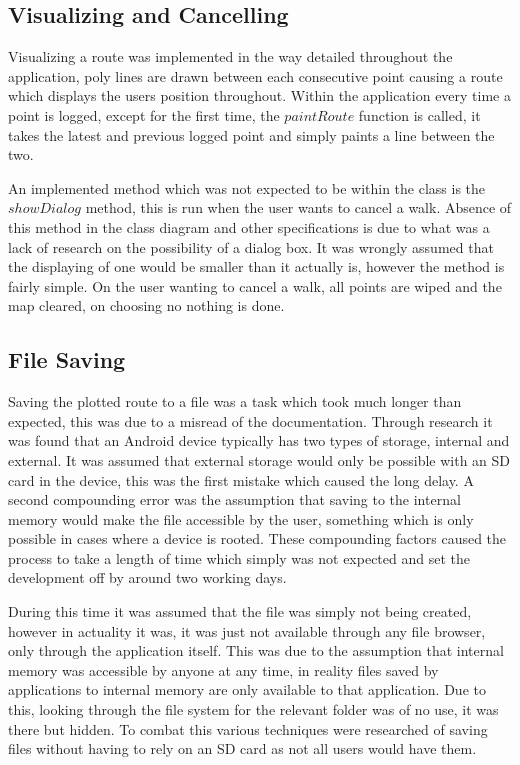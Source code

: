 \subsection{Visualizing and Cancelling}
Visualizing a route was implemented in the way detailed throughout the application, poly lines are drawn between each consecutive point causing a route which displays the users position throughout. Within the application every time a point is logged, except for the first time, the $paintRoute$ function is called, it takes the latest and previous logged point and simply paints a line between the two.

An implemented method which was not expected to be within the class is the $showDialog$ method, this is run when the user wants to cancel a walk. Absence of this method in the class diagram and other specifications is due to what was a lack of research on the possibility of a dialog box. It was wrongly assumed that the displaying of one would be smaller than it actually is, however the method is fairly simple. On the user wanting to cancel a walk, all points are wiped and the map cleared, on choosing no nothing is done.

\subsection{File Saving}
Saving the plotted route to a file was a task which took much longer than expected, this was due to a misread of the documentation. Through research it was found that an Android device typically has two types of storage, internal and external. It was assumed that external storage would only be possible with an SD card in the device, this was the first mistake which caused the long delay. A second compounding error was the assumption that saving to the internal memory would make the file accessible by the user\cite{storage}, something which is only possible in cases where a device is rooted. These compounding factors caused the process to take a length of time which simply was not expected and set the development off by around two working days. 

During this time it was assumed that the file was simply not being created, however in actuality it was, it was just not available through any file browser, only through the application itself. This was due to the assumption that internal memory was accessible by anyone at any time, in reality files saved by applications to internal memory are only available to that application. Due to this, looking through the file system for the relevant folder was of no use, it was there but hidden. To combat this various techniques were researched of saving files without having to rely on an SD card as not all users would have them. 

